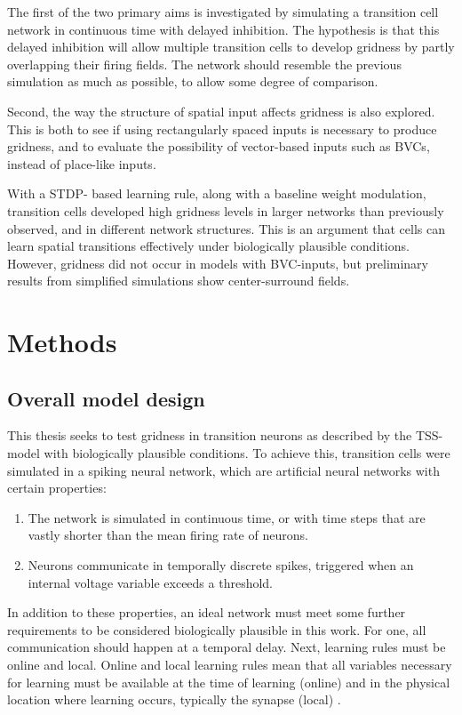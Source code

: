 \documentclass{article}
\begin{document}
    The first of the two primary aims is investigated by simulating a transition cell network in continuous time with delayed inhibition. The hypothesis is that this delayed inhibition will allow multiple transition cells to develop gridness by partly overlapping their firing fields. The network should resemble the previous simulation as much as possible, to allow some degree of comparison.

    Second, the way the structure of spatial input affects gridness is also explored. This is both to see if using rectangularly spaced inputs is necessary to produce gridness, and to evaluate the possibility of vector-based inputs such as BVCs, instead of place-like inputs.

    With a STDP- based learning rule, along with a baseline weight modulation, transition cells developed high gridness levels in larger networks than previously observed, and in different network structures. This is an argument that cells can learn spatial transitions effectively under biologically plausible conditions. However, gridness did not occur in models with BVC-inputs, but preliminary results from simplified simulations show center-surround fields.
    
    \newpage
    \section{Methods} \label{Methods}
    \subsection{Overall model design} \label{Overall Method}
    This thesis seeks to test gridness in transition neurons as described by the TSS-model with biologically plausible conditions. To achieve this, transition cells were simulated in a spiking neural network, which are artificial neural networks with certain properties:
    \begin{enumerate}
        \item The network is simulated in continuous time, or with time steps that are vastly shorter than the mean firing rate of neurons.
        \item Neurons communicate in temporally discrete spikes, triggered when an internal voltage variable exceeds a threshold.
    \end{enumerate}

    In addition to these properties, an ideal network must meet some further requirements to be considered biologically plausible in this work. For one, all communication should happen at a temporal delay. Next, learning rules must be online and local. Online and local learning rules mean that all variables necessary for learning must be available at the time of learning (online) and in the physical location where learning occurs, typically the synapse (local) \parencite{VanDerVeen2022}. 
    
\end{document}
